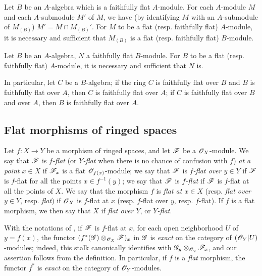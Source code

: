 \begin{env}[6.6.3]
\label{0.6.6.3}
Let $B$ be an $A$-algebra which is a faithfully flat $A$-module. For each $A$-module $M$ and
each $A$-submodule $M'$ of $M$, we have (by identifying $M$ with an $A$-submodule of
$M_{(B)}$) $M'=M\cap M_{(B)}'$. For $M$ to be a flat (resp. faithfully flat) $A$-module, it
is necessary and sufficient that $M_{(B)}$ is a flat (resp. faithfully flat) $B$-module.
\end{env}

\begin{env}[6.6.4]
\label{0.6.6.4}
Let $B$ be an $A$-algebra, $N$ a faithfully flat $B$-module. For $B$ to be a flat
(resp. faithfully flat) $A$-module, it is necessary and sufficient that $N$ is.

In particular, let $C$ be a $B$-algebra; if the ring $C$ is faithfully flat over $B$ and $B$
is faithfully flat over $A$, then $C$ is faithfully flat over $A$; if $C$ is faithfully flat
over $B$ and over $A$, then $B$ is faithfully flat over $A$.
\end{env}

\subsection{Flat morphisms of ringed spaces}
\label{subsection:flat-morphisms-of-ringed-spaces}

\begin{env}[6.7.1]
\label{0.6.7.1}
Let $f:X\to Y$ be a morphism of ringed spaces, and let $\mathscr{F}$ be a $\mathscr{O}_X$-module. We say
that $\mathscr{F}$ is \emph{$f$-flat} (or \emph{$Y$-flat} when there is no chance of confusion
with $f$) \emph{at a point $x\in X$} if $\mathscr{F}_x$ is a flat $\mathscr{O}_{f(x)}$-module; we say that
$\mathscr{F}$ is \emph{$f$-flat over $y\in Y$} if $\mathscr{F}$ is $f$-flat for all the points
$x\in f^{-1}(y)$; we say that $\mathscr{F}$ is \emph{$f$-flat} if $\mathscr{F}$ is $f$-flat at all the
points of $X$. We say that the morphism $f$ is \emph{flat at $x\in X$} (resp. \emph{flat over
$y\in Y$}, resp. \emph{flat}) if $\mathscr{O}_X$ is $f$-flat at $x$ (resp. $f$-flat over $y$, resp.
$f$-flat). If $f$ is a flat morphism, we then say that $X$ if \emph{flat over $Y$}, or
\emph{$Y$-flat}.
\end{env}

\begin{env}[6.7.2]
\label{0.6.7.2}
With the notations of , if $\mathscr{F}$ is $f$-flat at $x$, for each open
neighborhood $U$ of $y=f(x)$, the functor $(f^*(\mathscr{G})\otimes_{\mathscr{O}_X}\mathscr{F})_x$ in $\mathscr{G}$
is \emph{exact} on the category of $(\mathscr{O}_Y|U)$-modules; indeed, this stalk canonically
identifies with $\mathscr{G}_y\otimes_{\mathscr{O}_y}\mathscr{F}_x$, and our assertion follows from the
definition. In particular, if $f$ is a \emph{flat} morphism, the functor $f^*$ is
\emph{exact} on the category of $\mathscr{O}_Y$-modules.
\end{env}


